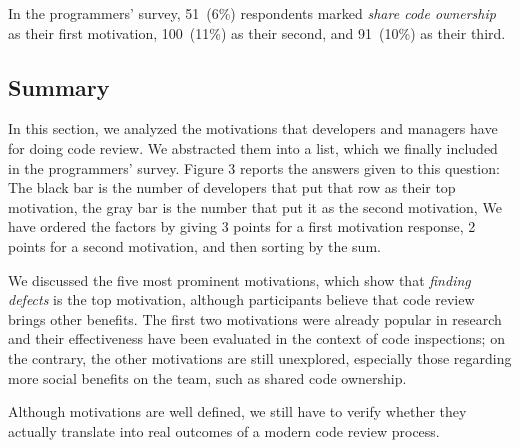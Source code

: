 In the programmers' survey, 51~(6\%) respondents marked \emph{share code
ownership} as their first motivation, 100~(11\%) as their second, and 91~(10\%)
as their third.

\subsection{Summary}

In this section, we analyzed the motivations that developers and managers have
for doing code review. We abstracted them into a list, which we finally
included in the programmers' survey. Figure 3 reports the answers given to this
question: The black bar is the number of developers that put that row as their
top motivation, the gray bar is the number that put it as the second
motivation, \etc We have ordered the factors by giving 3 points for a first
motivation response, 2 points for a second motivation, \etc and then sorting by
the sum. 

We discussed the five most prominent motivations, which show that \emph{finding
defects} is the top motivation, although participants believe that code review
brings other benefits. The first two motivations were already popular in
research and their effectiveness have been evaluated in the context of code
inspections; on the contrary, the other motivations are still unexplored,
especially those regarding more social benefits on the team, such as shared
code ownership.

Although motivations are well defined, we still have to verify whether they
actually translate into real outcomes of a modern code review process. 
